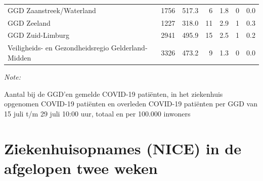 \documentclass[
  english,
  man,floatsintext]{apa6}
\begin{document}
\begin{table}
\begin{threeparttable}
\begin{tabular}{lrrrrrr}
GGD Zaanstreek/Waterland & 1756 & 517.3 & 6 & 1.8 & 0 & 0.0\\
GGD Zeeland & 1227 & 318.0 & 11 & 2.9 & 1 & 0.3\\
GGD Zuid-Limburg & 2941 & 495.9 & 15 & 2.5 & 1 & 0.2\\
Veiligheids- en Gezondheidsregio Gelderland-Midden & 3326 & 473.2 & 9 & 1.3 & 0 & 0.0\\
\bottomrule
\end{tabular}
\begin{tablenotes}
\item \textit{Note: } 
\item Aantal bij de GGD’en gemelde COVID-19 patiënten, in het ziekenhuis opgenomen COVID-19 patiënten en overleden COVID-19 patiënten per GGD van 15 juli t/m 29 juli 10:00 uur, totaal en per 100.000 inwoners
\end{tablenotes}
\end{threeparttable}
\endgroup{}
\end{table}

\newpage

\hypertarget{ziekenhuisopnames-nice-in-de-afgelopen-twee-weken}{%
\section{Ziekenhuisopnames (NICE) in de afgelopen twee weken}\label{ziekenhuisopnames-nice-in-de-afgelopen-twee-weken}}
\end{document}
